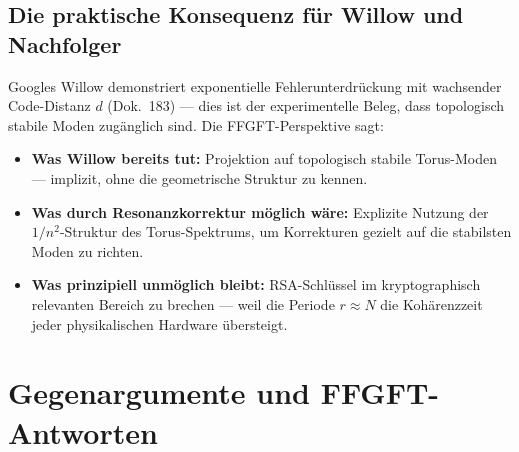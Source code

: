 \subsection{Die praktische Konsequenz für Willow und Nachfolger}

Googles Willow demonstriert exponentielle Fehlerunterdrückung mit wachsender
Code-Distanz $d$ (Dok.~183) — dies ist der experimentelle Beleg, dass topologisch
stabile Moden zugänglich sind. Die FFGFT-Perspektive sagt:

\begin{itemize}
    \item \textbf{Was Willow bereits tut:} Projektion auf topologisch stabile
    Torus-Moden — implizit, ohne die geometrische Struktur zu kennen.
    \item \textbf{Was durch Resonanzkorrektur möglich wäre:} Explizite Nutzung
    der $1/n^2$-Struktur des Torus-Spektrums, um Korrekturen gezielt auf die
    stabilsten Moden zu richten.
    \item \textbf{Was prinzipiell unmöglich bleibt:} RSA-Schlüssel im kryptographisch
    relevanten Bereich zu brechen — weil die Periode $r \approx N$ die Kohärenzzeit
    jeder physikalischen Hardware übersteigt.
\end{itemize}


\section{Gegenargumente und FFGFT-Antworten}

\begin{table}[ht]
\centering
{}
\caption{Standard-Argumente der Quanteninformatik und FFGFT-Antworten}
\end{table}


